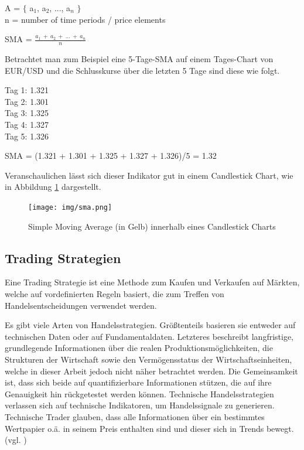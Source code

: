 \documentclass[oneside]{ausarbeitung}
\begin{document}
A = $ \{ $ {a$_{1}$, a$_{2}$, ..., a$_{n}$} $ \} $ \\
n = number of time periods / price elements

SMA = $\frac{a_1 \ + \ a_2 \ + \ ... \ + \ a_n}{n}$

Betrachtet man zum Beispiel eine 5-Tage-SMA auf einem Tages-Chart von
EUR/USD und die Schlusskurse über die letzten 5 Tage sind diese wie folgt.

Tag 1: 1.321 \\
Tag 2: 1.301 \\
Tag 3: 1.325 \\
Tag 4: 1.327 \\
Tag 5: 1.326

SMA = (1.321 + 1.301 + 1.325 + 1.327 + 1.326)/5 = 1.32

Veranschaulichen lässt sich dieser Indikator gut in einem Candlestick
Chart, wie in Abbildung \ref{fig:3} dargestellt.

\begin{figure}[H]
  \centering
  \texttt{[image: img/sma.png]}
  \caption{Simple Moving Average (in Gelb) innerhalb eines Candlestick Charts}
  \label{fig:3}
\end{figure} 

\subsection{Trading Strategien}
\label{sub:trading_strategien}

Eine Trading Strategie ist eine Methode zum Kaufen und Verkaufen auf
Märkten, welche auf vordefinierten Regeln basiert, die zum Treffen von
Handelsentscheidungen verwendet werden\cite{trading_strategy}.

Es gibt viele Arten von Handelsstrategien. Größtenteils basieren sie
entweder auf technischen Daten oder auf
Fundamentaldaten. Letzteres beschreibt langfristige, grundlegende
Informationen über die realen Produktionsmöglichkeiten, die
Strukturen der Wirtschaft sowie den Vermögensstatus der
Wirtschaftseinheiten, welche in dieser Arbeit jedoch nicht näher
betrachtet werden\cite{fundamentaldaten}. Die Gemeinsamkeit ist, dass
sich beide auf quantifizierbare Informationen stützen, die auf ihre
Genauigkeit hin rückgetestet werden können.
Technische Handelsstrategien verlassen sich auf technische
Indikatoren, um Handelssignale zu generieren. Technische Trader
glauben, dass alle Informationen über ein bestimmtes Wertpapier o.ä.
in seinem Preis enthalten sind und dieser sich in Trends bewegt.
(vgl. \cite{trading_strategy}) 
\end{document}
